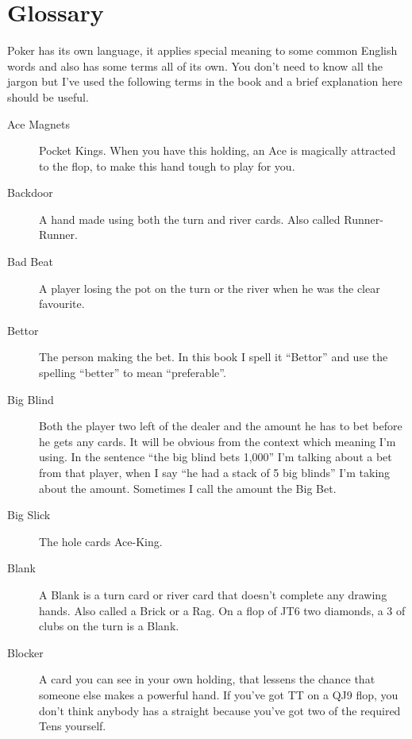 \chapter{Glossary}



Poker has its own language, it applies special meaning to some
common English words and also has some terms all of its own. You
don't need to know all the jargon but I've used the following terms
in the book and a brief explanation here should be useful.

\begin{description}

\item[Ace Magnets] Pocket Kings. When you have this holding, an Ace is
magically attracted to the flop, to make this hand tough to play for
you.

\item[Backdoor] A hand made using both the turn and river cards. Also
called Runner-Runner.

\item[Bad Beat] A player losing the pot on the turn or the river when
he was the clear favourite.

\item[Bettor] The person making the bet. In this book I spell it ``Bettor''
and use the spelling ``better'' to mean ``preferable''.

\item[Big Blind] Both the player two left of the dealer and the amount
he has to bet before he gets any cards. It will be obvious from the
context which meaning I'm using. In the sentence ``the big blind bets
1,000'' I'm talking about a bet from that player, when I say ``he had
a stack of 5 big blinds'' I'm taking about the amount. Sometimes I
call the amount the Big Bet.

\item[Big Slick] The hole cards Ace-King.

\item[Blank] A Blank is a turn card or river card that doesn't
complete any drawing hands. Also called a Brick or a Rag. On a flop of
JT6 two diamonds, a 3 of clubs on the turn is a Blank.

\item[Blocker] A card you can see in your own holding, that lessens
the chance that someone else makes a powerful hand. If you've got TT
on a QJ9 flop, you don't think anybody has a straight because you've
got two of the required Tens yourself.


\end{description}
